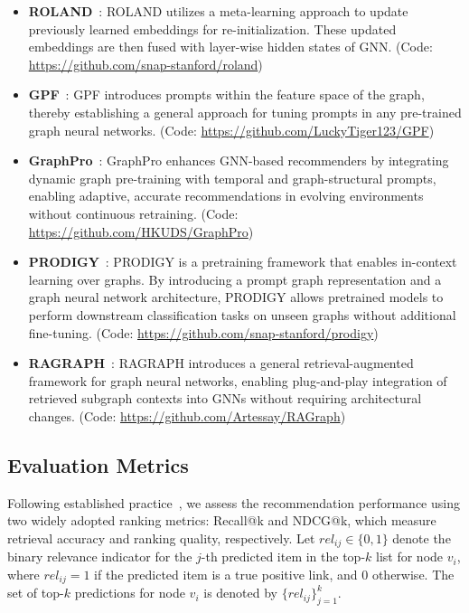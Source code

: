 \documentclass[letterpaper]{article} %
\begin{document}
\begin{itemize}[leftmargin=*]
    \item \textbf{ROLAND}~\cite{you2022roland}: ROLAND utilizes a meta-learning approach to update previously learned embeddings for re-initialization. These updated embeddings are then fused with layer-wise hidden states of GNN. (Code: \url{https://github.com/snap-stanford/roland})
    
    \item \textbf{GPF}~\cite{fang2023universal}: GPF introduces prompts within the feature space of the graph, thereby establishing a general approach for tuning prompts in any pre-trained graph neural networks. (Code: \url{https://github.com/LuckyTiger123/GPF})
    \item \textbf{GraphPro}~\cite{yang2024graphpro}: GraphPro enhances GNN-based recommenders by integrating dynamic graph pre-training with temporal and graph-structural prompts, enabling adaptive, accurate recommendations in evolving environments without continuous retraining. (Code: \url{https://github.com/HKUDS/GraphPro})
    
    \item \textbf{PRODIGY}~\cite{mishchenko2023prodigy}: PRODIGY is a pretraining framework that enables in-context learning over graphs. By introducing a prompt graph representation and a graph neural network architecture, PRODIGY allows pretrained models to perform downstream classification tasks on unseen graphs without additional fine-tuning. (Code: \url{https://github.com/snap-stanford/prodigy})
    
    \item \textbf{RAGRAPH}~\cite{jiang2024ragraph}: RAGRAPH introduces a general retrieval-augmented framework for graph neural networks, enabling plug-and-play integration of retrieved subgraph contexts into GNNs without requiring architectural changes. (Code: \url{https://github.com/Artessay/RAGraph})
    
\end{itemize}




\subsection{Evaluation Metrics}
\label{appendix:evaluation-metrics}

Following established practice~\cite{sgl, he2020lightgcn}, we assess the recommendation performance using two widely adopted ranking metrics: Recall@k and NDCG@k, which measure retrieval accuracy and ranking quality, respectively. Let $rel_{ij} \in \{0, 1\}$ denote the binary relevance indicator for the $j$-th predicted item in the top-$k$ list for node $v_i$, where $rel_{ij} = 1$ if the predicted item is a true positive link, and $0$ otherwise. The set of top-$k$ predictions for node $v_i$ is denoted by $\{rel_{ij}\}_{j=1}^k$.
\end{document}
